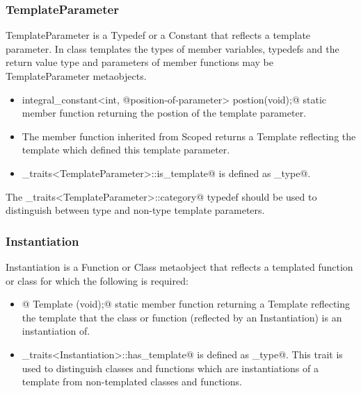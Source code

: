 \subsubsection{TemplateParameter}

{\metaobject TemplateParameter} is a {\metaobject Typedef} or a {\metaobject Constant} that
reflects a template parameter. In class templates the types of member variables, typedefs and
the return value type and parameters of member functions may be {\metaobject TemplateParameter}
metaobjects.

\begin{itemize}
	\item{\verb@static integral_constant<int, @{\metaobject position-of-parameter}\verb@> postion(void);@}
	static member function returning the postion of the template parameter.

	\item The \verb@scope@ member function inherited from {\metaobject Scoped} returns a {\metaobject Template}
	reflecting the template which defined this template parameter.

	\item \verb@metaobject_traits<TemplateParameter>::is_template@ is defined as \verb@true_type@.
\end{itemize}

The \verb@metaobject_traits<TemplateParameter>::category@ typedef should be used to distinguish between
type and non-type template parameters.

\subsubsection{Instantiation}

{\metaobject Instantiation} is a {\metaobject Function} or {\metaobject Class} metaobject
that reflects a templated function or class for which the following is required:

\begin{itemize}

	\item{\verb@static @ {\metaobject Template} \verb@model(void);@} static member function returning
	a {\metaobject Template} reflecting the template that the class or function 
	(reflected by an {\metaobject Instantiation}) is an instantiation of.

	\item \verb@metaobject_traits<Instantiation>::has_template@ is defined as \verb@true_type@.
	This trait is used to distinguish classes and functions which are instantiations
	of a template from non-templated classes and functions.
\end{itemize}

